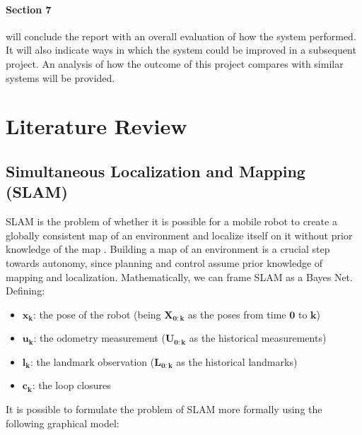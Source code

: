 \documentclass[12pt]{article}
\begin{document}
\paragraph{Section 7} will conclude the report with an overall evaluation of how the system performed. It will also indicate ways in which the system could be improved in a subsequent project. An analysis of how the outcome of this project compares with similar systems will be provided.

	\newpage
	\section{Literature Review}

	\subsection{Simultaneous Localization and Mapping (SLAM)}
	\label{subs:SLAMRev}

SLAM is the problem of whether it is possible for a mobile robot to create a globally consistent map of an environment and localize itself on it without prior knowledge of the map \cite{SLAMPartI}\cite{Cadena}. Building a map of an environment is a crucial step towards autonomy, since planning and control assume prior knowledge of mapping and localization. Mathematically, we can frame SLAM as a Bayes Net. Defining:
	
\begin{itemize}
\item $\mathbf{x_k}$: the pose of the robot (being $\mathbf{X_{0:k}}$ as the poses from time $\mathbf{0}$ to $\mathbf{k}$)
\item $\mathbf{u_k}$: the odometry measurement ($\mathbf{U_{0:k}}$ as the historical measurements)
\item $\mathbf{l_k}$: the landmark observation ($\mathbf{L_{0:k}}$ as the historical landmarks)
\item $\mathbf{c_k}$: the loop closures
\end{itemize}

It is possible to formulate the problem of SLAM more formally using the following graphical model:
\end{document}
